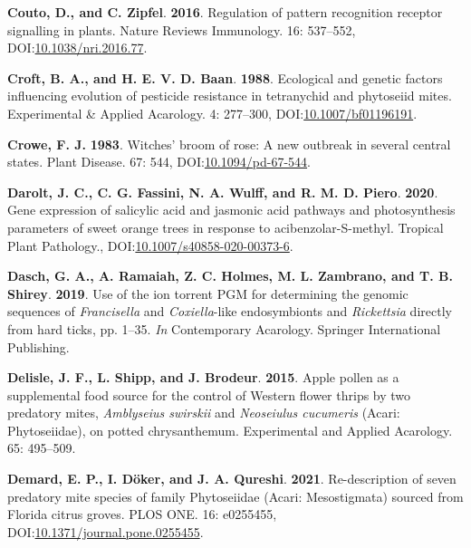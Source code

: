 \documentclass[12pt,final,CPage]{ufthesis}
\newlength{\cslhangindent}
\newenvironment{CSLReferences}[2] %
{%
	\setlength{\parindent}{0pt}
	\ifodd #1 \everypar{\setlength{\hangindent}{\cslhangindent}}\ignorespaces\fi
	\ifnum #2 > 0
	\setlength{\parskip}{#2\baselineskip}
	\fi
}%
{}
\begin{document}
{\begin{CSLReferences}{1}{0}
  \leavevmode{}%
  \textbf{Couto, D., and C. Zipfel}. \textbf{2016}. Regulation of pattern recognition receptor signalling in plants. Nature Reviews Immunology. 16: 537--552, DOI:\href{https://doi.org/10.1038/nri.2016.77}{10.1038/nri.2016.77}.

  \leavevmode{}%
  \textbf{Croft, B. A., and H. E. V. D. Baan}. \textbf{1988}. Ecological and genetic factors influencing evolution of pesticide resistance in tetranychid and phytoseiid mites. Experimental {\&} Applied Acarology. 4: 277--300, DOI:\href{https://doi.org/10.1007/bf01196191}{10.1007/bf01196191}.

  \leavevmode{}%
  \textbf{Crowe, F. J.} \textbf{1983}. Witches' broom of rose: A new outbreak in several central states. Plant Disease. 67: 544, DOI:\href{https://doi.org/10.1094/pd-67-544}{10.1094/pd-67-544}.

  \leavevmode{}%
  \textbf{Darolt, J. C., C. G. Fassini, N. A. Wulff, and R. M. D. Piero}. \textbf{2020}. Gene expression of salicylic acid and jasmonic acid pathways and photosynthesis parameters of sweet orange trees in response to acibenzolar-{S}-methyl. Tropical Plant Pathology., DOI:\href{https://doi.org/10.1007/s40858-020-00373-6}{10.1007/s40858-020-00373-6}.

  \leavevmode{}%
  \textbf{Dasch, G. A., A. Ramaiah, Z. C. Holmes, M. L. Zambrano, and T. B. Shirey}. \textbf{2019}. Use of the ion torrent {PGM} for determining the genomic sequences of {\emph{Francisella}} and {\emph{Coxiella}}-like endosymbionts and {\emph{Rickettsia}} directly from hard ticks, pp. 1--35. \emph{In} Contemporary Acarology. Springer International Publishing.

  \leavevmode{}%
  \textbf{Delisle, J. F., L. Shipp, and J. Brodeur}. \textbf{2015}. Apple pollen as a supplemental food source for the control of {Western flower thrips} by two predatory mites, {\emph{Amblyseius swirskii}} and {\emph{Neoseiulus cucumeris}} {({Acari}: {Phytoseiidae})}, on potted chrysanthemum. Experimental and Applied Acarology. 65: 495--509.

  \leavevmode{}%
  \textbf{Demard, E. P., I. Döker, and J. A. Qureshi}. \textbf{2021}. Re-description of seven predatory mite species of family {Phytoseiidae} ({Acari}: {Mesostigmata}) sourced from {Florida} citrus groves. {PLOS} {ONE}. 16: e0255455, DOI:\href{https://doi.org/10.1371/journal.pone.0255455}{10.1371/journal.pone.0255455}.


\end{CSLReferences}}
\end{document}
